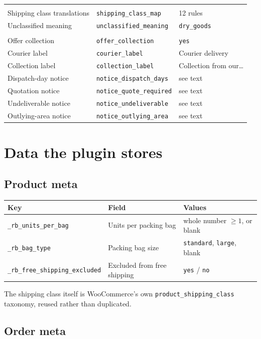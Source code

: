 \documentclass[11pt,a4paper,oneside]{report}
\newcommand{\opt}[1]{\texttt{\small #1}}
\begin{document}
\begin{longtable}{@{}L{4.9cm}L{6.4cm}L{2.9cm}@{}}
\addlinespace
{}\\
Shipping class translations & \opt{shipping\_class\_map} & 12 rules\\
Unclassified meaning & \opt{unclassified\_meaning} & \opt{dry\_goods}\\
\addlinespace
{}\\
Offer collection & \opt{offer\_collection} & \opt{yes}\\
Courier label & \opt{courier\_label} & \textsf{Courier delivery}\\
Collection label & \opt{collection\_label} & \textsf{Collection from our\dots}\\
Dispatch-day notice & \opt{notice\_dispatch\_days} & see text\\
Quotation notice & \opt{notice\_quote\_required} & see text\\
Undeliverable notice & \opt{notice\_undeliverable} & see text\\
Outlying-area notice & \opt{notice\_outlying\_area} & see text\\
\bottomrule
\end{longtable}

\chapter{Data the plugin stores}

\section{Product meta}

\begin{longtable}{@{}L{5.8cm}L{4.0cm}L{4.6cm}@{}}
\toprule
\textbf{Key} & \textbf{Field} & \textbf{Values}\\
\midrule
\endhead
\opt{\_rb\_units\_per\_bag} & Units per packing bag & whole number $\geq 1$, or blank\\
\opt{\_rb\_bag\_type} & Packing bag size & \opt{standard}, \opt{large}, blank\\
\opt{\_rb\_free\_shipping\_excluded} & Excluded from free shipping & \opt{yes} / \opt{no}\\
\bottomrule
\end{longtable}

The shipping class itself is WooCommerce's own \opt{product\_shipping\_class}
taxonomy, reused rather than duplicated.

\section{Order meta}
\end{document}
